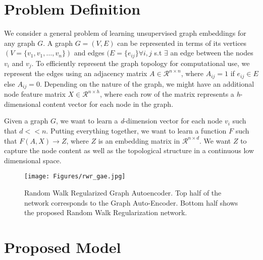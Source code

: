 \documentclass{article}
\begin{document}
\section{Problem Definition}
We consider a general problem of learning unsupervised graph embeddings for any graph $G$. A graph $G = (V, E)$ can be represented in terms of its vertices $(V = \{v_1, v_1, \dots, v_n\})$ and edges $(E=\{e_{ij} \} \forall i, j$ s.t $\exists $ an edge between the nodes $v_i$ and $v_j$. To efficiently represent the graph topology for computational use, we represent the edges using an adjacency matrix $A \in \mathcal{R}^{n \times n}$, where $A_{ij} = 1$ if $e_{ij} \in E$ else $A_{ij} = 0$. Depending on the nature of the graph, we might have an additional node feature matrix $X \in \mathcal{R}^{n \times h}$, where each row of the matrix represents a \textit{h}-dimensional content vector for each node in the graph.

Given a graph $G$, we want to learn a \textit{d}-dimension vector for each node $v_i$ such that $d << n$. Putting everything together, we want to learn a function $F$ such that $F(A, X) \longrightarrow Z$, where $Z$ is an embedding matrix in $\mathcal{R}^{n \times d}$. We want $Z$ to capture the node content as well as the topological structure in a continuous low dimensional space.

\begin{figure*}[h]
\centering
\texttt{[image: Figures/rwr\_gae.jpg]}
\caption{Random Walk Regularized Graph Autoencoder. Top half of the network corresponds to the Graph Auto-Encoder. Bottom half shows the proposed Random Walk Regularization network. \label{arch}}
\end{figure*}

\section{Proposed Model}
\end{document}
